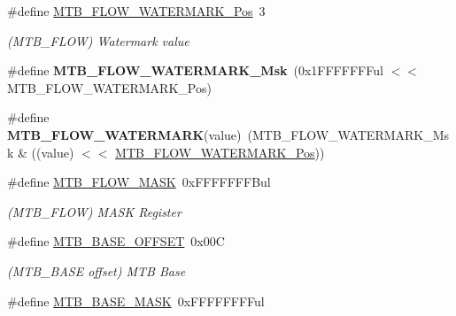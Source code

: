 \begin{DoxyCompactItemize}
\item 
\hypertarget{group___s_a_m_l21___m_t_b_ga5047b754b723c5d838de576f2fe36ea6}{}\#define \hyperlink{group___s_a_m_l21___m_t_b_ga5047b754b723c5d838de576f2fe36ea6}{M\+T\+B\+\_\+\+F\+L\+O\+W\+\_\+\+W\+A\+T\+E\+R\+M\+A\+R\+K\+\_\+\+Pos}~3\label{group___s_a_m_l21___m_t_b_ga5047b754b723c5d838de576f2fe36ea6}

\begin{DoxyCompactList}\small\item\em (M\+T\+B\+\_\+\+F\+L\+O\+W) Watermark value \end{DoxyCompactList}\item 
\hypertarget{group___s_a_m_l21___m_t_b_ga49657c927dfe9f148f53c055c52d486e}{}\#define {\bfseries M\+T\+B\+\_\+\+F\+L\+O\+W\+\_\+\+W\+A\+T\+E\+R\+M\+A\+R\+K\+\_\+\+Msk}~(0x1\+F\+F\+F\+F\+F\+F\+Ful $<$$<$ M\+T\+B\+\_\+\+F\+L\+O\+W\+\_\+\+W\+A\+T\+E\+R\+M\+A\+R\+K\+\_\+\+Pos)\label{group___s_a_m_l21___m_t_b_ga49657c927dfe9f148f53c055c52d486e}

\item 
\hypertarget{group___s_a_m_l21___m_t_b_ga0f03b8d04398169f94530728a93c3cbf}{}\#define {\bfseries M\+T\+B\+\_\+\+F\+L\+O\+W\+\_\+\+W\+A\+T\+E\+R\+M\+A\+R\+K}(value)~(M\+T\+B\+\_\+\+F\+L\+O\+W\+\_\+\+W\+A\+T\+E\+R\+M\+A\+R\+K\+\_\+\+Msk \& ((value) $<$$<$ \hyperlink{group___s_a_m_l21___m_t_b_ga5047b754b723c5d838de576f2fe36ea6}{M\+T\+B\+\_\+\+F\+L\+O\+W\+\_\+\+W\+A\+T\+E\+R\+M\+A\+R\+K\+\_\+\+Pos}))\label{group___s_a_m_l21___m_t_b_ga0f03b8d04398169f94530728a93c3cbf}

\item 
\hypertarget{group___s_a_m_l21___m_t_b_ga807afadf5425d38a2743d4ecfb5416cd}{}\#define \hyperlink{group___s_a_m_l21___m_t_b_ga807afadf5425d38a2743d4ecfb5416cd}{M\+T\+B\+\_\+\+F\+L\+O\+W\+\_\+\+M\+A\+S\+K}~0x\+F\+F\+F\+F\+F\+F\+F\+Bul\label{group___s_a_m_l21___m_t_b_ga807afadf5425d38a2743d4ecfb5416cd}

\begin{DoxyCompactList}\small\item\em (M\+T\+B\+\_\+\+F\+L\+O\+W) M\+A\+S\+K Register \end{DoxyCompactList}\item 
\hypertarget{group___s_a_m_l21___m_t_b_ga0af6267c34da71a91a6b17b39d3d17ec}{}\#define \hyperlink{group___s_a_m_l21___m_t_b_ga0af6267c34da71a91a6b17b39d3d17ec}{M\+T\+B\+\_\+\+B\+A\+S\+E\+\_\+\+O\+F\+F\+S\+E\+T}~0x00\+C\label{group___s_a_m_l21___m_t_b_ga0af6267c34da71a91a6b17b39d3d17ec}

\begin{DoxyCompactList}\small\item\em (M\+T\+B\+\_\+\+B\+A\+S\+E offset) M\+T\+B Base \end{DoxyCompactList}\item 
\hypertarget{group___s_a_m_l21___m_t_b_gaf69153abeeed342b1f4195254d116031}{}\#define \hyperlink{group___s_a_m_l21___m_t_b_gaf69153abeeed342b1f4195254d116031}{M\+T\+B\+\_\+\+B\+A\+S\+E\+\_\+\+M\+A\+S\+K}~0x\+F\+F\+F\+F\+F\+F\+F\+Ful\label{group___s_a_m_l21___m_t_b_gaf69153abeeed342b1f4195254d116031}


\end{DoxyCompactItemize}
